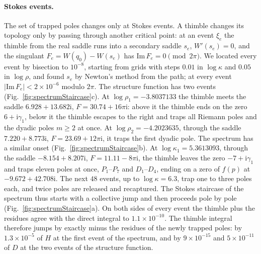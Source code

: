 \documentclass[floatfix,aps,pre,preprint,superscriptaddress,nofootinbib,amsmath,amssymb]{revtex4-2}
\def\I{\mathrm{i}}
\begin{document}
\paragraph*{Stokes events.}\label{sec:stokesEvents}
The set of trapped poles changes only at Stokes events. A thimble changes its topology only by passing through another
critical point: at an event $\xi_e$ the thimble from the real saddle runs into a secondary saddle $s_e$, $W'(s_e)=0$, and the
singulant $F_e=W(q_0)-W(s_e)$ has $\mathrm{Im}\,F_e=0\pmod{2\pi}$. We located every event by bisection to $10^{-8}$,
starting from grids with steps $0.01$ in $\log\kappa$ and $0.05$ in $\log\rho$, and found $s_e$ by Newton's method from the
path; at every event $|\mathrm{Im}\,F_e|<2\times10^{-6}$ modulo $2\pi$. The structure function has two events
(Fig.~\ref{fig:spectrumStaircase}c). At $\log\rho_1=-3.8037133$ the thimble meets the saddle $6.928+13.682\I$,
$F=30.74+16\pi\I$: above it the thimble ends on the zero $6+\I\gamma_1$, below it the thimble escapes to the right and traps
all Riemann poles and the dyadic poles $m\ge2$ at once. At $\log\rho_2=-4.2023635$, through the saddle $7.220+8.773\I$,
$F=23.69+12\pi\I$, it traps the first dyadic pole. The spectrum has a similar onset (Fig.~\ref{fig:spectrumStaircase}b). At
$\log\kappa_1=5.3613093$, through the saddle $-8.154+8.207\I$, $F=11.11-8\pi\I$, the thimble leaves the zero $-7+\I\gamma_1$
and traps eleven poles at once, $P_1$--$P_7$ and $D_1$--$D_4$, ending on a zero of $f(p)$ at $-9.672+42.708\I$. The next
$48$ events, up to $\log\kappa=6.3$, trap one to three poles each, and twice poles are released and recaptured. The Stokes
staircase of the spectrum thus starts with a collective jump and then proceeds pole by pole
(Fig.~\ref{fig:spectrumStaircase}a). On both sides of every event the thimble plus the residues agree with the direct
integral to $1.1\times10^{-10}$. The thimble integral therefore jumps by exactly minus the residues of the newly trapped
poles: by $1.3\times10^{-5}$ of $H$ at the first event of the spectrum, and by $9\times10^{-15}$ and $5\times10^{-11}$ of $D$
at the two events of the structure function.
\end{document}
